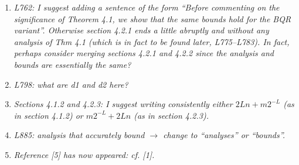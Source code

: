 \documentclass[final,onefignum,onetabnum]{siamart190516}
\begin{document}
\begin{enumerate}
    \item {\it L762: I suggest adding a sentence of the form “Before commenting on the significance of Theorem 4.1, we show that the same bounds hold for the BQR variant”. Otherwise section 4.2.1 ends a little abruptly and without any analysis of Thm 4.1 (which is in fact to be found later, L775–L783). In fact, perhaps consider merging sections 4.2.1 and 4.2.2 since the analysis and bounds are essentially the same?}
    \item {\it L798: what are d1 and d2 here?}
    \item {\it Sections 4.1.2 and 4.2.3: I suggest writing consistently either $2Ln + m2^{-L}$ (as in
section 4.1.2) or $m2^{-L} + 2Ln$ (as in section 4.2.3).}
    \item {\it L885: analysis that accurately bound $\rightarrow$ change to ``analyses'' or ``bounds''.}
    \item {\it Reference [5] has now appeared: cf. [1].}
\end{enumerate}


\end{document}
